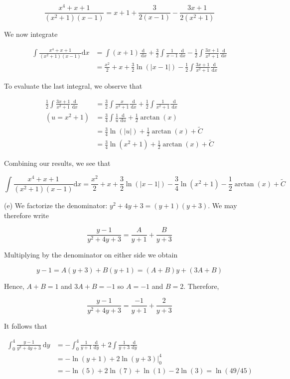 \documentclass[10pt]{article}
\begin{document}
$$
\frac{x^{4}+x+1}{\left(x^{2}+1\right)(x-1)}=x+1+\frac{3}{2(x-1)}-\frac{3 x+1}{2\left(x^{2}+1\right)}
$$

We now integrate

$$
\begin{aligned}
\int \frac{x^{4}+x+1}{\left(x^{2}+1\right)(x-1)} \mathrm{d} x & =\int(x+1) \frac{\mathrm{d}}{\mathrm{~d} x}+\frac{3}{2} \int \frac{1}{x-1} \frac{\mathrm{~d}}{\mathrm{~d} x}-\frac{1}{2} \int \frac{3 x+1}{x^{2}+1} \frac{\mathrm{~d}}{\mathrm{~d} x} \\
& =\frac{x^{2}}{2}+x+\frac{3}{2} \ln (|x-1|)-\frac{1}{2} \int \frac{3 x+1}{x^{2}+1} \frac{\mathrm{~d}}{\mathrm{~d} x}
\end{aligned}
$$

To evaluate the last integral, we observe that

$$
\begin{aligned}
\frac{1}{2} \int \frac{3 x+1}{x^{2}+1} \frac{\mathrm{~d}}{\mathrm{~d} x} & =\frac{3}{2} \int \frac{x}{x^{2}+1} \frac{\mathrm{~d}}{\mathrm{~d} x}+\frac{1}{2} \int \frac{1}{x^{2}+1} \frac{\mathrm{~d}}{\mathrm{~d} x} \\
\left(u=x^{2}+1\right) & =\frac{3}{4} \int \frac{1}{u} \frac{\mathrm{~d}}{\mathrm{~d} u}+\frac{1}{2} \arctan (x) \\
& =\frac{3}{4} \ln (|u|)+\frac{1}{2} \arctan (x)+\widetilde{C} \\
& =\frac{3}{4} \ln \left(x^{2}+1\right)+\frac{1}{2} \arctan (x)+\widetilde{C}
\end{aligned}
$$

Combining our results, we see that

$$
\int \frac{x^{4}+x+1}{\left(x^{2}+1\right)(x-1)} \mathrm{d} x=\frac{x^{2}}{2}+x+\frac{3}{2} \ln (|x-1|)-\frac{3}{4} \ln \left(x^{2}+1\right)-\frac{1}{2} \arctan (x)+\widetilde{C}
$$

(e) We factorize the denominator: $y^{2}+4 y+3=(y+1)(y+3)$. We may therefore write

$$
\frac{y-1}{y^{2}+4 y+3}=\frac{A}{y+1}+\frac{B}{y+3}
$$

Multiplying by the denominator on either side we obtain

$$
y-1=A(y+3)+B(y+1)=(A+B) y+(3 A+B)
$$

Hence, $A+B=1$ and $3 A+B=-1$ so $A=-1$ and $B=2$. Therefore,

$$
\frac{y-1}{y^{2}+4 y+3}=\frac{-1}{y+1}+\frac{2}{y+3}
$$

It follows that

$$
\begin{aligned}
\int_{0}^{4} \frac{y-1}{y^{2}+4 y+3} \mathrm{~d} y & =-\int_{0}^{4} \frac{1}{y+1} \frac{\mathrm{~d}}{\mathrm{~d} y}+2 \int \frac{1}{y+3} \frac{\mathrm{~d}}{\mathrm{~d} y} \\
& =-\ln (y+1)+\left.2 \ln (y+3)\right|_{0} ^{4} \\
& =-\ln (5)+2 \ln (7)+\ln (1)-2 \ln (3)=\ln (49 / 45)
\end{aligned}
$$
\end{document}
